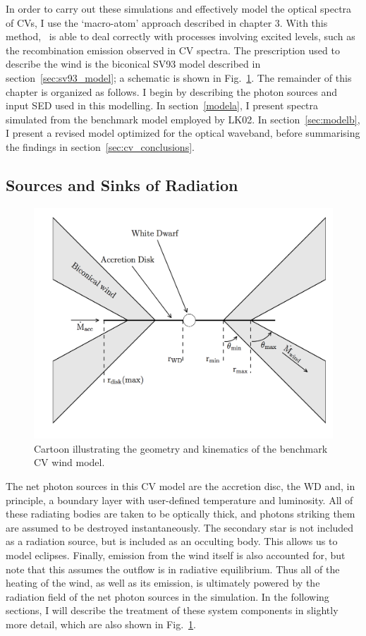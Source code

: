 In order to carry out these simulations and effectively model the optical
spectra of CVs, I use the `macro-atom' approach described in chapter 3. 
With this method, \py\ is able to deal correctly with processes involving
excited levels, such as the recombination emission observed in CV spectra.
The prescription used to describe the wind is the biconical SV93 model described in 
section~\ref{sec:sv93_model}; a schematic is shown in Fig.~\ref{cartoon}.
The remainder of this chapter is organized as follows. I begin
by describing the photon sources and input SED used in this modelling.
In section~\ref{modela}, I present spectra simulated from the benchmark 
model employed by LK02. In section~\ref{sec:modelb}, I present a revised model
optimized for the optical waveband, before summarising the
findings in section~\ref{sec:cv_conclusions}.


\subsection{Sources and Sinks of Radiation}
\label{radsources}

\begin{figure} 
\centering
\includegraphics[width=1.0\textwidth]{figures/05-cvpaper/fig2_cartoon.png}
\caption{Cartoon illustrating the geometry and kinematics of the benchmark CV wind model.}
\label{cartoon}
\end{figure} 

The net photon sources in this CV model are the accretion disc, the
WD and, in principle, a boundary layer with user-defined temperature
and luminosity. All of these radiating bodies are taken to be
optically thick, and photons striking them are assumed to be destroyed
instantaneously. The secondary star is not included as a radiation
source, but is included as an occulting body. This allows us to model
eclipses. Finally, emission from the wind itself is also accounted for, but
note that this assumes the outflow is in radiative equilibrium. Thus all
of the heating of the wind, as well as its emission, is ultimately
powered by the radiation field of the net photon sources in the
simulation. In the following sections, I will describe the treatment
of these system components in slightly more detail, which are also
shown in Fig.~\ref{cartoon}.


